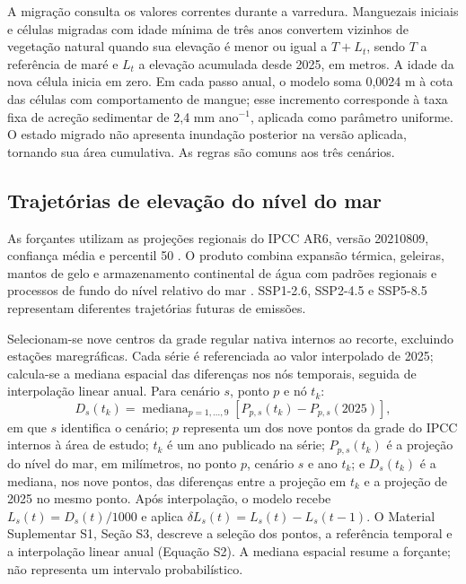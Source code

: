 \documentclass[12pt,a4paper]{article}
\begin{document}
A migração consulta os valores correntes durante a varredura. Manguezais iniciais e células migradas com idade mínima de três anos convertem vizinhos de vegetação natural quando sua elevação é menor ou igual a $T+L_t$, sendo $T$ a referência de maré e $L_t$ a elevação acumulada desde 2025, em metros. A idade da nova célula inicia em zero. Em cada passo anual, o modelo soma 0,0024 m à cota das células com comportamento de mangue; esse incremento corresponde à taxa fixa de acreção sedimentar de 2,4 mm ano$^{-1}$, aplicada como parâmetro uniforme. O estado migrado não apresenta inundação posterior na versão aplicada, tornando sua área cumulativa. As regras são comuns aos três cenários.

\subsection{Trajetórias de elevação do nível do mar}
As forçantes utilizam as projeções regionais do IPCC AR6, versão 20210809, confiança média e percentil 50 \citep{garner2021}. O produto combina expansão térmica, geleiras, mantos de gelo e armazenamento continental de água com padrões regionais e processos de fundo do nível relativo do mar \citep{fox2021,kopp2023}. SSP1-2.6, SSP2-4.5 e SSP5-8.5 representam diferentes trajetórias futuras de emissões.

Selecionam-se nove centros da grade regular nativa internos ao recorte, excluindo estações maregráficas. Cada série é referenciada ao valor interpolado de 2025; calcula-se a mediana espacial das diferenças nos nós temporais, seguida de interpolação linear anual. Para cenário $s$, ponto $p$ e nó $t_k$:
\begin{equation}
D_s(t_k)=\operatorname{mediana}_{p=1,\ldots,9}\!\left[P_{p,s}(t_k)-P_{p,s}(2025)\right],
\label{eq:trajetoria}
\end{equation}
em que $s$ identifica o cenário; $p$ representa um dos nove pontos da grade do IPCC internos à área de estudo; $t_k$ é um ano publicado na série; $P_{p,s}(t_k)$ é a projeção do nível do mar, em milímetros, no ponto $p$, cenário $s$ e ano $t_k$; e $D_s(t_k)$ é a mediana, nos nove pontos, das diferenças entre a projeção em $t_k$ e a projeção de 2025 no mesmo ponto. Após interpolação, o modelo recebe $L_s(t)=D_s(t)/1000$ e aplica $\delta L_s(t)=L_s(t)-L_s(t-1)$. O Material Suplementar S1, Seção S3, descreve a seleção dos pontos, a referência temporal e a interpolação linear anual (Equação S2). A mediana espacial resume a forçante; não representa um intervalo probabilístico.
\end{document}
